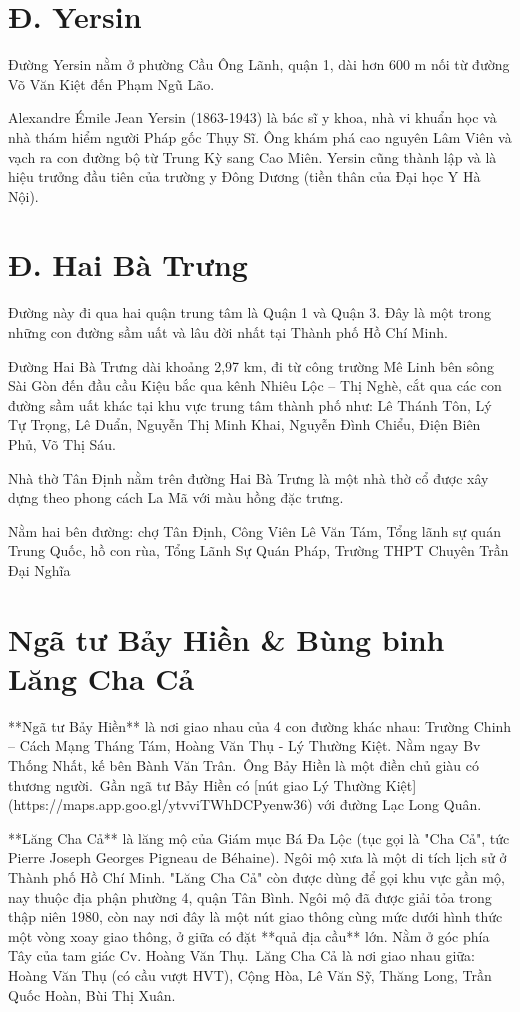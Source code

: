 \section{Đ. Yersin}

Đường Yersin nằm ở phường Cầu Ông Lãnh, quận 1, dài hơn 600 m nối từ đường Võ Văn Kiệt đến Phạm Ngũ Lão.

Alexandre Émile Jean Yersin (1863-1943) là bác sĩ y khoa, nhà vi khuẩn học và nhà thám hiểm người Pháp gốc Thụy Sĩ. Ông khám phá cao nguyên Lâm Viên và vạch ra con đường bộ từ Trung Kỳ sang Cao Miên. Yersin cũng thành lập và là hiệu trưởng đầu tiên của trường y Đông Dương (tiền thân của Đại học Y Hà Nội).

\section{Đ. Hai Bà Trưng}

Đường này đi qua hai quận trung tâm là Quận 1 và Quận 3. Đây là một trong những con đường sầm uất và lâu đời nhất tại Thành phố Hồ Chí Minh.

Đường Hai Bà Trưng dài khoảng 2,97 km, đi từ công trường Mê Linh bên sông Sài Gòn đến đầu cầu Kiệu bắc qua kênh Nhiêu Lộc – Thị Nghè, cắt qua các con đường sầm uất khác tại khu vực trung tâm thành phố như: Lê Thánh Tôn, Lý Tự Trọng, Lê Duẩn, Nguyễn Thị Minh Khai, Nguyễn Đình Chiểu, Điện Biên Phủ, Võ Thị Sáu.

Nhà thờ Tân Định nằm trên đường Hai Bà Trưng là một nhà thờ cổ được xây dựng theo phong cách La Mã với màu hồng đặc trưng.

Nằm hai bên đường: chợ Tân Định, Công Viên Lê Văn Tám, Tổng lãnh sự quán Trung Quốc, hồ con rùa, Tổng Lãnh Sự Quán Pháp, Trường THPT Chuyên Trần Đại Nghĩa

\section{Ngã tư Bảy Hiền \& Bùng binh Lăng Cha Cả}

**Ngã tư Bảy Hiền** là nơi giao nhau của 4 con đường khác nhau: Trường Chinh – Cách Mạng Tháng Tám, Hoàng Văn Thụ - Lý Thường Kiệt. Nằm ngay Bv Thống Nhất, kế bên Bành Văn Trân.\
Ông Bảy Hiền là một điền chủ giàu có thương người.\
Gần ngã tư Bảy Hiền có [nút giao Lý Thường Kiệt](https://maps.app.goo.gl/ytvviTWhDCPyenw36) với đường Lạc Long Quân.

**Lăng Cha Cả** là lăng mộ của Giám mục Bá Đa Lộc (tục gọi là "Cha Cả", tức Pierre Joseph Georges Pigneau de Béhaine). Ngôi mộ xưa là một di tích lịch sử ở Thành phố Hồ Chí Minh. "Lăng Cha Cả" còn được dùng để gọi khu vực gần mộ, nay thuộc địa phận phường 4, quận Tân Bình. Ngôi mộ đã được giải tỏa trong thập niên 1980, còn nay nơi đây là một nút giao thông cùng mức dưới hình thức một vòng xoay giao thông, ở giữa có đặt **quả địa cầu** lớn. Nằm ở góc phía Tây của tam giác Cv. Hoàng Văn Thụ.\
Lăng Cha Cả là nơi giao nhau giữa: Hoàng Văn Thụ (có cầu vượt HVT), Cộng Hòa, Lê Văn Sỹ, Thăng Long, Trần Quốc Hoàn, Bùi Thị Xuân.

